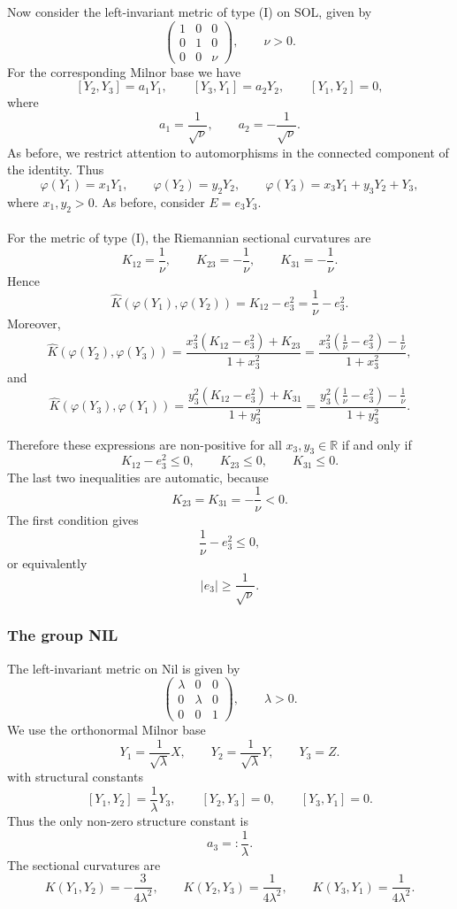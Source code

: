 \documentclass[12pt]{article}
\begin{document}
Now consider the left-invariant metric of type (I) on SOL, given by
\[
\begin{pmatrix}
1 & 0 & 0\\
0 & 1 & 0\\
0 & 0 & \nu
\end{pmatrix},
\qquad \nu>0.
\]
For the corresponding Milnor base we have
\[
[Y_2,Y_3]=a_1Y_1,\qquad
[Y_3,Y_1]=a_2Y_2,\qquad
[Y_1,Y_2]=0,
\]
where
\[
a_1=\frac{1}{\sqrt{\nu}},
\qquad
a_2=-\frac{1}{\sqrt{\nu}}.
\]
As before, we restrict attention to automorphisms in the connected component
of the identity. Thus
\[
\varphi(Y_1)=x_1Y_1,\qquad
\varphi(Y_2)=y_2Y_2,\qquad
\varphi(Y_3)=x_3Y_1+y_3Y_2+Y_3,
\]
where \(x_1,y_2>0\). As before, consider $E = e_3Y_3$. \\~\\

For the metric of type (I), the Riemannian sectional curvatures are
\[
K_{12}=\frac{1}{\nu}, \qquad 
K_{23} = 
-\frac{1}{\nu}, \qquad 
K_{31} =-\frac{1}{\nu}.
\]
Hence
\[
\widehat K(\varphi(Y_1),\varphi(Y_2))
=
K_{12}-e_3^2
=
\frac{1}{\nu}-e_3^2.
\]
Moreover,
\[
\widehat K(\varphi(Y_2),\varphi(Y_3))
=
\frac{x_3^2(K_{12}-e_3^2)+K_{23}}{1+x_3^2}
=
\frac{x_3^2\left(\frac{1}{\nu}-e_3^2\right)-\frac{1}{\nu}}
{1+x_3^2},
\]
and
\[
\widehat K(\varphi(Y_3),\varphi(Y_1))
=
\frac{y_3^2(K_{12}-e_3^2)+K_{31}}{1+y_3^2}
=
\frac{y_3^2\left(\frac{1}{\nu}-e_3^2\right)-\frac{1}{\nu}}
{1+y_3^2}.
\]

Therefore these expressions are non-positive for all \(x_3,y_3\in\mathbb R\)
if and only if
\[
K_{12}-e_3^2\leq 0,
\qquad
K_{23}\leq 0,
\qquad
K_{31}\leq 0.
\]
The last two inequalities are automatic, because
\[
K_{23}=K_{31}=-\frac{1}{\nu}<0.
\]
The first condition gives
\[
\frac{1}{\nu}-e_3^2\leq 0,
\]
or equivalently
\[
|e_3|\geq \frac{1}{\sqrt{\nu}}.
\]

\subsubsection{The group NIL}

The left-invariant metric on Nil is given by
\[
\begin{pmatrix}
\lambda & 0 & 0\\
0 & \lambda & 0\\
0 & 0 & 1
\end{pmatrix},
\qquad \lambda>0.
\]
We use the orthonormal Milnor base
\[
Y_1=\frac{1}{\sqrt{\lambda}}X,\qquad
Y_2=\frac{1}{\sqrt{\lambda}}Y,\qquad
Y_3=Z.
\]
with structural constants
\[
[Y_1,Y_2]=\frac{1}{\lambda}Y_3,\qquad
[Y_2,Y_3]=0,\qquad
[Y_3,Y_1]=0.
\]
Thus the only non-zero structure constant is
\[
a_3=: \frac{1}{\lambda}.
\]
The sectional curvatures are
\[
K(Y_1,Y_2)=-\frac{3}{4\lambda^2},
\qquad
K(Y_2,Y_3)=\frac{1}{4\lambda^2},
\qquad
K(Y_3,Y_1)=\frac{1}{4\lambda^2}.
\]
\end{document}
